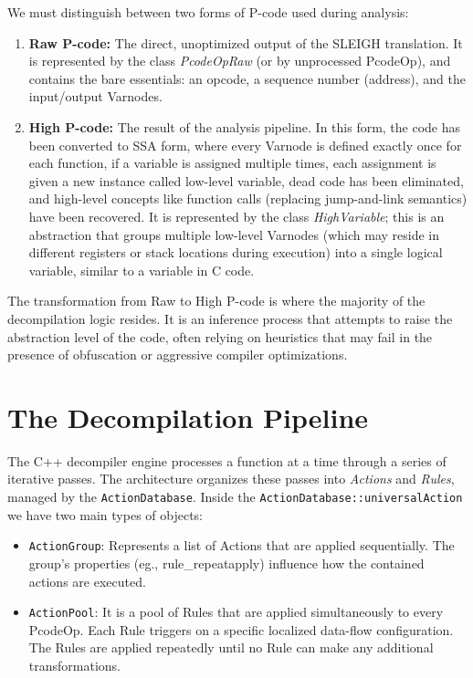 We must distinguish between two forms of P-code used during analysis:
\begin{enumerate}
    \item \textbf{Raw P-code:} The direct, unoptimized output of the SLEIGH translation. 
    It is represented by the class \emph{PcodeOpRaw} (or by unprocessed PcodeOp), 
    and contains the bare essentials: an opcode, a sequence number (address), and 
    the input/output Varnodes.
    \item \textbf{High P-code:} The result of the analysis pipeline. In this form, 
    the code has been converted to \ac{SSA} form, where every Varnode is defined 
    exactly once for each function, if a variable is assigned multiple times, each assignment 
    is given a new instance called low-level variable, dead code has been eliminated, 
    and high-level concepts like function calls (replacing jump-and-link semantics) 
    have been recovered. It is represented by the class \emph{HighVariable}; 
    this is an abstraction that groups multiple low-level Varnodes (which may reside 
    in different registers or stack locations during execution) into a single logical 
    variable, similar to a variable in C code.
\end{enumerate}

The transformation from Raw to High P-code is where the majority of the decompilation logic resides.
It is an inference process that attempts to raise the abstraction level of the code,
often relying on heuristics that may fail in the presence of obfuscation
or aggressive compiler optimizations.

\section{The Decompilation Pipeline}\label{sec:pipeline}

The C++ decompiler engine processes a function at a time through a series of iterative passes. 
The architecture organizes these passes into \emph{Actions} and \emph{Rules}, 
managed by the \texttt{ActionDatabase}.
Inside the \texttt{ActionDatabase::universalAction} we have two main types of objects:
\begin{itemize}
    \item \texttt{ActionGroup}: Represents a list of Actions that are applied sequentially. The group's properties (eg., rule\_repeatapply) influence how the contained actions are executed.
    \item \texttt{ActionPool}: It is a pool of Rules that are applied simultaneously to every PcodeOp. Each Rule triggers on a specific localized data-flow configuration. The Rules are applied repeatedly until no Rule can make any additional transformations.
\end{itemize}

